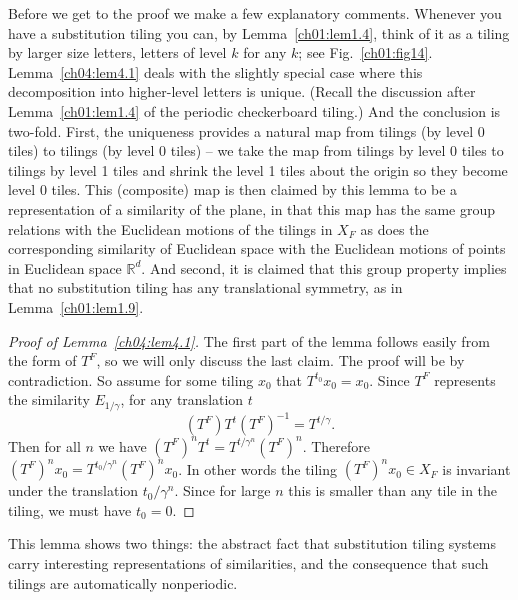 \documentclass[reqno]{stml-l}
\theoremstyle{plain}
\theoremstyle{definition}
\numberwithin{equation}{chapter}
\begin{document}
Before we get to the proof we make a few explanatory
comments. Whenever you have a substitution tiling you can,
by Lemma~\ref{ch01:lem1.4}, think of it as a tiling by
larger size letters, letters of level $k$ for any $k$; see
Fig.~\ref{ch01:fig14}. Lemma~\ref{ch04:lem4.1} deals with
the slightly special case where this decomposition into
higher-level letters is unique. (Recall the discussion
after Lemma~\ref{ch01:lem1.4} of the periodic checkerboard
tiling.) And the conclusion is two-fold. First, the
uniqueness provides a natural map from tilings (by level
$0$ tiles) to tilings (by level $0$ tiles) -- we take the
map from tilings by level $0$ tiles to tilings by level 1
tiles and shrink the level 1 tiles about the origin so they
become level $0$ tiles. This (composite) map is then
claimed by this lemma to be a representation of a
similarity of the plane, in that this map has the same
group relations with the Euclidean motions of the tilings
in $X_{F}$ as does the corresponding similarity of
Euclidean space with the Euclidean motions of points in
Euclidean space $\mathbb{R}^{d}$. And second, it is claimed
that this group property implies that no substitution
tiling has any translational symmetry, as in
Lemma~\ref{ch01:lem1.9}.

\begin{proof}[Proof of Lemma~\ref{ch04:lem4.1}]
The first part of the lemma follows easily from the form of $T^{F}$, so we will only discuss the last claim. The proof will be by contradiction. So assume for some tiling $x_{0}$ that $T^{t_{0}}x_{0}= x_{0}$. Since $T^{F}$ represents the similarity $E_{1/\gamma}$, for any translation $t$
\begin{equation}\label{ch04:eqn4.4}
(T^{F})T^{t}(T^{F})^{-1}=T^{t/\gamma}.
\end{equation}
Then for all $n$ we have $(T^{F})^{n}T^{t}=T^{t/\gamma^{n}}(T^{F})^{n}$. Therefore $(T^{F})^{n}x_{0}= T^{t_{0}/\gamma^{n}}(T^{F})^{n}x_{0}$. In other words the tiling $(T^{F})^{n}x_{0}\in X_{F}$ is invariant under the translation $t_{0}/\gamma^{n}$. Since for large $n$ this is smaller than any tile in the tiling, we must have $t_{0}=0$.
\end{proof}

This lemma shows two things: the abstract fact that substitution tiling systems carry interesting representations of similarities, and the consequence that such tilings are automatically nonperiodic.
\end{document}

